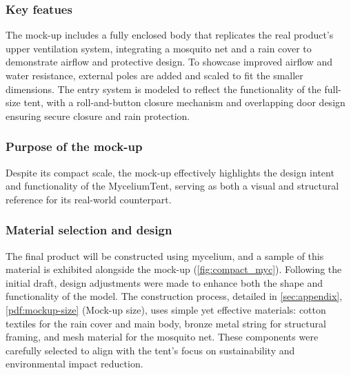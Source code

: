 \documentclass{article}
\begin{document}
\subsubsection{Key featues}
The mock-up includes a fully enclosed body that replicates the real product’s upper
ventilation system, integrating a mosquito net and a rain cover to demonstrate airflow
and protective design. To showcase improved airflow and water resistance, external poles
are added and scaled to fit the smaller dimensions. The entry system is modeled to reflect
the functionality of the full-size tent, with a roll-and-button closure mechanism and
overlapping door design ensuring secure closure and rain protection.

\subsubsection{Purpose of the mock-up}
Despite its compact scale, the mock-up effectively highlights the design intent and
functionality of the MyceliumTent, serving as both a visual and structural reference for
its real-world counterpart.

\subsubsection{Material selection and design}
The final product will be constructed using mycelium, and a sample of this material is
exhibited alongside the mock-up (\autoref{fig:compact_myc}). Following the initial draft,
design adjustments were made to enhance both the shape and functionality of the model. The
construction process, detailed in \autoref{sec:appendix}, \autoref{pdf:mockup-size} (Mock-up size),
uses simple yet effective materials: cotton textiles for the rain cover and main body,
bronze metal string for structural framing, and mesh material for the mosquito net. These
components were carefully selected to align with the tent’s focus on sustainability and
environmental impact reduction.
\end{document}
